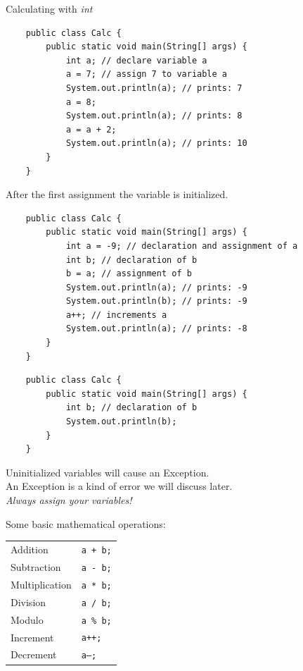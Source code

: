 \begin{frame}{Calculating with \emph{int}}
	\begin{lstlisting}
	public class Calc {
	    public static void main(String[] args) {
	        int a; // declare variable a
	        a = 7; // assign 7 to variable a
	        System.out.println(a); // prints: 7
	        a = 8;
	        System.out.println(a); // prints: 8
	        a = a + 2;
	        System.out.println(a); // prints: 10
	    }
	}
	\end{lstlisting}
	After the first assignment the variable is initialized.
\framebreak
	\begin{lstlisting}
	public class Calc {
	    public static void main(String[] args) {
	        int a = -9; // declaration and assignment of a
	        int b; // declaration of b
	        b = a; // assignment of b
	        System.out.println(a); // prints: -9
	        System.out.println(b); // prints: -9
	        a++; // increments a
	        System.out.println(a); // prints: -8
	    }
	}
	\end{lstlisting}
\framebreak
	\begin{lstlisting}
	public class Calc {
	    public static void main(String[] args) {
	        int b; // declaration of b
	        System.out.println(b);
	    }
	}
	\end{lstlisting}
	Uninitialized variables will cause an Exception. \\
	An Exception is a kind of error we will discuss later.\\
	\vspace{1em}
	\emph{Always assign your variables!}
\framebreak

	Some basic mathematical operations:
	\begin{tabular}{ll}
		Addition & \texttt{a + b;} \\
		Subtraction & \texttt{a - b;} \\
		Multiplication &\texttt{a * b;} \\
		Division & \texttt{a / b;} \\
		Modulo & \texttt{a \% b;} \\
		Increment & \texttt{a++;} \\
		Decrement & \texttt{a--;} \\
	\end{tabular}
\end{frame}

